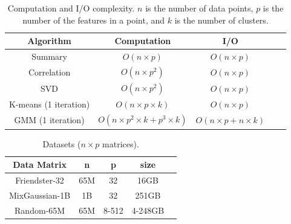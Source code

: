 %
\begin{table}
\begin{center}
\footnotesize
\begin{tabular}{|c|c|c|c|c|}
\hline
Algorithm & Computation & I/O \\
\hline
Summary & $O(n \times p)$ & $O(n \times p)$ \\
\hline
Correlation & $O(n \times p^2)$ & $O(n \times p)$ \\
\hline
SVD & $O(n \times p^2)$ & $O(n \times p)$ \\
\hline
K-means (1 iteration) & $O(n \times p \times k)$ & $O(n \times p)$ \\
\hline
GMM (1 iteration) & $O(n \times p^2 \times k + p^3 \times k)$ & $O(n \times p + n \times k)$ \\
\hline
\end{tabular}
\normalsize
\end{center}
\caption{Computation and I/O complexity. 
$n$ is the number of data points, $p$ 
is the number of the features in a point, and $k$ is the number of
clusters. }
\label{tbl:algs}
\end{table}


\begin{table}
\begin{center}
\footnotesize
\begin{tabular}{|c|c|c|c|c|}
\hline
Data Matrix & n & p & size \\
\hline
Friendster-32 \cite{friendster} & 65M & 32 & 16GB \\
\hline
MixGaussian-1B & 1B & 32 & 251GB \\
\hline
Random-65M & 65M & 8-512 & 4-248GB \\
\hline
\end{tabular}
\normalsize
\end{center}
\caption{Datasets ($n \times p$ matrices).}
\label{tbl:data}
\end{table}


